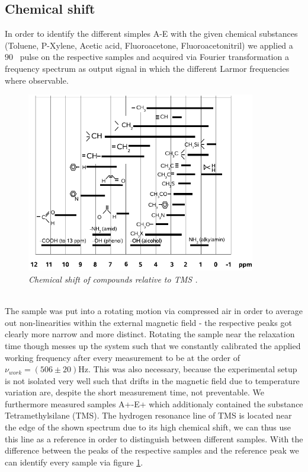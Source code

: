 \subsection{Chemical shift}
In order to identify the different simples A-E with the given chemical substances (Toluene, P-Xylene, Acetic acid, Fluoroacetone, Fluoroacetonitril) we applied a $90$ \textdegree\, pulse on the respective samples and acquired via Fourier transformation a frequency spectrum as output signal in which the different Larmor frequencies where observable.
\begin{figure}[h]
	\includegraphics[width=100mm]{Calibration}
	\centering
	\caption{\itshape Chemical shift of compounds relative to TMS \cite{manual}.}
	\label{fig:5}
\end{figure}
\noindent
\\
The sample was put into a rotating motion via compressed air in order to average out non-linearities within the external magnetic field - the respective peaks got clearly more narrow and more distinct. Rotating the sample near the relaxation time though messes up the system such that we constantly calibrated the applied working frequency after every measurement to be at the order of $\nu _{work} = (506 \pm 20) \mathrm{Hz}$. This was also necessary, because the experimental setup is not isolated very well such that drifts in the magnetic field due to temperature variation are, despite the short measurement time, not preventable.
 We furthermore measured samples A+-E+ which additionaly contained the substance Tetramethylsilane (TMS). The hydrogen resonance line of TMS is located near the edge of the shown spectrum due to its high chemical shift, we can thus use this line as a reference in order to distinguish between different samples. With the difference between the peaks of the respective samples and the reference peak we can identify every sample via figure \ref{fig:5}.
